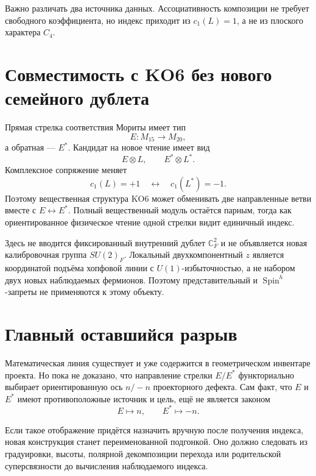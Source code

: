 Важно различать два источника данных. Ассоциативность композиции не
требует свободного коэффициента, но индекс приходит из $c_1(L)=1$, а не
из плоского характера $C_4$.

\section{Совместимость с KO6 без нового семейного дублета}

Прямая стрелка соответствия Мориты имеет тип
\begin{equation}
 E:M_{15}\longrightarrow M_{20},
\end{equation}
а обратная --- $E^*$. Кандидат на новое чтение имеет вид
\begin{equation}
 E\otimes L,
 \qquad
 E^*\otimes L^*.
 \label{eq:v5-hopf-oriented-morita-pair}
\end{equation}
Комплексное сопряжение меняет
\begin{equation}
 c_1(L)=+1
 \quad\longleftrightarrow\quad
 c_1(L^*)=-1.
\end{equation}
Поэтому вещественная структура KO6 может обменивать две направленные
ветви вместе с $E\leftrightarrow E^*$. Полный вещественный модуль остаётся
парным, тогда как ориентированное физическое чтение одной стрелки видит
единичный индекс.

Здесь не вводится фиксированный внутренний дублет
$\mathbb C^2_F$ и не объявляется новая калибровочная группа $SU(2)_F$.
Локальный двухкомпонентный $z$ является координатой подъёма хопфовой
линии с $U(1)$-избыточностью, а не набором двух новых наблюдаемых
фермионов. Поэтому представительный и $\operatorname{Spin}^h$-запреты не
применяются к этому объекту.

\section{Главный оставшийся разрыв}

Математическая линия существует и уже содержится в геометрическом
инвентаре проекта. Но пока не доказано, что направление стрелки
$E/E^*$ функториально выбирает ориентированную ось $n/-n$ проекторного
дефекта. Сам факт, что $E$ и $E^*$ имеют противоположные источник и цель,
ещё не является законом
\begin{equation}
 E\longmapsto n,
 \qquad
 E^*\longmapsto-n.
 \label{eq:v5-hopf-missing-orientation-functor}
\end{equation}

Если такое отображение придётся назначить вручную после получения
индекса, новая конструкция станет переименованной подгонкой. Оно должно
следовать из градуировки, высоты, полярной декомпозиции перехода или
родительской суперсвязности до вычисления наблюдаемого индекса.


